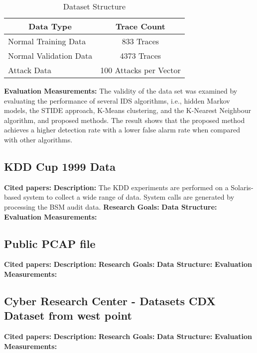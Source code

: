 \begin{table}[h]
\begin{tabular}{|l|c|}
\hline
\multicolumn{1}{|c|}{\textbf{Data Type}} & \textbf{Trace Count} \\ \hline
Normal Training Data & 833 Traces \\ \hline
Normal Validation Data & 4373 Traces \\ \hline
Attack Data & 100 Attacks per Vector \\ \hline
\end{tabular}
\caption{Dataset Structure}
\end{table}

\textbf{Evaluation Measurements:} The validity of the data set was examined by evaluating the performance of several IDS algorithms, i.e., hidden Markov models, the STIDE approach, K-Means clustering, and the K-Nearest Neighbour algorithm, and proposed methods. The result shows that the proposed method achieves a higher detection rate with a lower false alarm rate when compared with other algorithms.\newline

\subsection{KDD Cup 1999 Data}
\textbf{Cited papers:}\newline
\textbf{Description:} The KDD experiments are performed on a Solaris-based system to collect a wide range of data. System calls are generated by processing the BSM audit data. 
\textbf{Research Goals:} \newline
\textbf{Data Structure:} \newline
\textbf{Evaluation Measurements:} \newline

\subsection{Public PCAP file}
\textbf{Cited papers:} \newline
\textbf{Description:} \newline
\textbf{Research Goals:} \newline
\textbf{Data Structure:} \newline
\textbf{Evaluation Measurements:} \newline

\subsection{Cyber Research Center - Datasets CDX Dataset from west point}
\textbf{Cited papers:} \newline
\textbf{Description:} \newline
\textbf{Research Goals:} \newline
\textbf{Data Structure:} \newline
\textbf{Evaluation Measurements:} \newline

